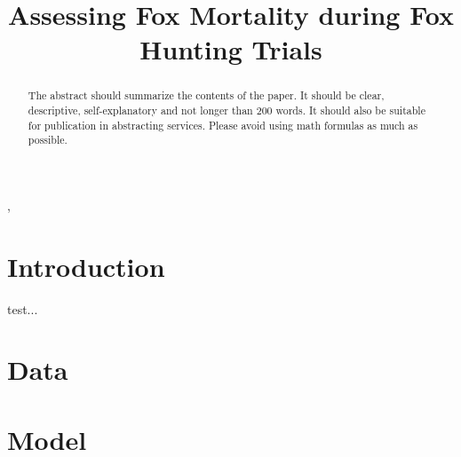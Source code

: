 \documentclass[aoas,preprint]{imsart}
\numberwithin{equation}{section}
\theoremstyle{plain}
\begin{document}
\begin{frontmatter}
\title{Assessing Fox Mortality during Fox Hunting Trials}

\begin{aug}
\author{ },
\author{ }




\address{Address of the First and Second authors\\
Usually a few lines long\\
\\
\phantom{E-mail:\ }}

\end{aug}

\begin{abstract}
The abstract should summarize the contents of the paper.
It should be clear, descriptive, self-explanatory and not longer
than 200 words. It should also be suitable for publication in
abstracting services. Please avoid using math formulas as much as possible.

\end{abstract}

\begin{keyword}[class=MSC]
\end{keyword}

\begin{keyword}
\kwd{\LaTeXe}
\end{keyword}

\end{frontmatter}

\section{Introduction}
test...
\section{Data}

\section{Model}
\end{document}

